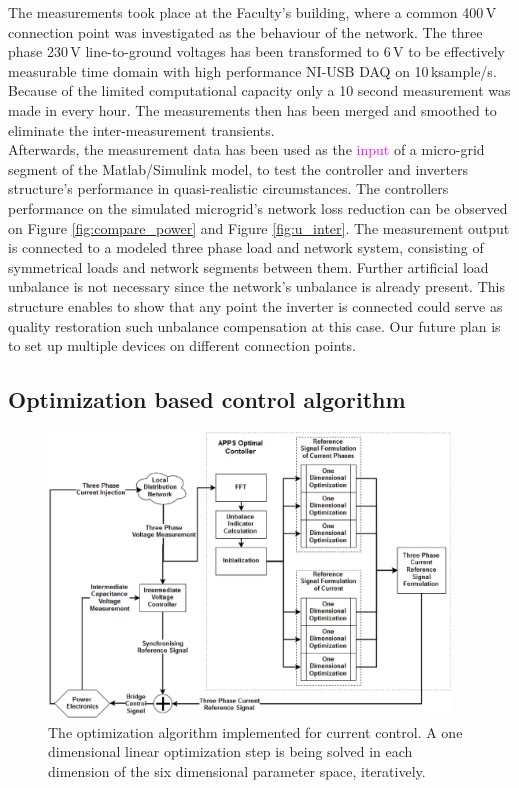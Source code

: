             The measurements took place at the Faculty's building, where a common 400\,V connection point was investigated as the behaviour of the network. The three phase 230\,V line-to-ground voltages has been transformed to 6\,V to be effectively measurable time domain with high performance NI-USB DAQ on 10\,ksample/s. Because of the limited computational capacity only a 10 second measurement was made in every hour.  The measurements then has been merged and smoothed to eliminate the inter-measurement transients.\\
            Afterwards, the measurement data has been used as the \textcolor{magenta}{input} of a micro-grid segment of the Matlab/Simulink model, to test the controller and inverters structure's performance in quasi-realistic circumstances. The controllers performance on the simulated microgrid's network loss reduction can be observed on Figure \ref{fig:compare_power} and Figure \ref{fig:u_inter}. The measurement output is connected to a modeled three phase load and network system, consisting of symmetrical loads and network segments between them. Further artificial load unbalance is not necessary since the network's unbalance is already present. This structure enables to show that any point the inverter is connected could serve as quality restoration such unbalance compensation at this case. Our future plan is to set up multiple devices on different connection points.

    \subsection{Optimization based control algorithm}

        \begin{figure}[ht]
        \centering
        \includegraphics[width=0.95\textwidth]{Unblance_EPS_Pics/APPS_1_2_.eps}
        \caption{The optimization algorithm implemented for current control. A one dimensional linear optimization step is being solved in each dimension of the six dimensional parameter space, iteratively.}
        \label{fig:APPS}
        \end{figure}

